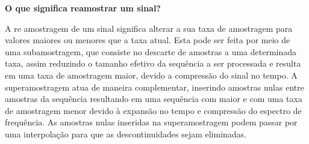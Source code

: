 \textbf{O que significa reamostrar um sinal?}

A re amostragem de um sinal significa alterar a sua taxa de amostragem para valores maiores ou menores que a taxa atual. Esta pode ser feita por meio de uma subamostragem, que consiste no descarte de amostras a uma determinada taxa, assim reduzindo o tamanho efetivo da sequência a ser processada e resulta em uma taxa de amostragem maior, devido a compressão do sinal no tempo. A superamostragem atua de maneira complementar, inserindo amostras nulas entre amostras da sequência resultando em uma sequência com maior e com uma taxa de amostragem menor devido à expansão no tempo e compressão do espectro de frequência. As amostras nulas inseridas na superamostragem podem passar por uma interpolação para que as descontinuidades sejam eliminadas.
